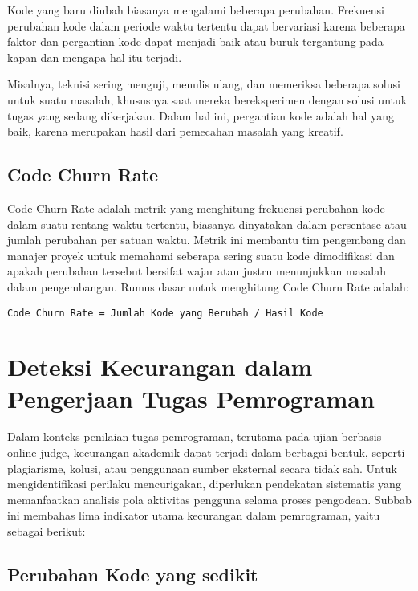 Kode yang baru diubah biasanya mengalami beberapa perubahan. Frekuensi perubahan kode dalam periode waktu tertentu dapat bervariasi karena beberapa faktor dan pergantian kode dapat menjadi baik atau buruk tergantung pada kapan dan mengapa hal itu terjadi.

Misalnya, teknisi sering menguji, menulis ulang, dan memeriksa beberapa solusi untuk suatu masalah, khususnya saat mereka bereksperimen dengan solusi untuk tugas yang sedang dikerjakan. Dalam hal ini, pergantian kode adalah hal yang baik, karena merupakan hasil dari pemecahan masalah yang kreatif.

\subsection{Code Churn Rate}

Code Churn Rate adalah metrik yang menghitung frekuensi perubahan kode dalam suatu rentang waktu tertentu, biasanya dinyatakan dalam persentase atau jumlah perubahan per satuan waktu. Metrik ini membantu tim pengembang dan manajer proyek untuk memahami seberapa sering suatu kode dimodifikasi dan apakah perubahan tersebut bersifat wajar atau justru menunjukkan masalah dalam pengembangan. Rumus dasar untuk menghitung Code Churn Rate adalah:

\begin{center}
	\verb|Code Churn Rate = Jumlah Kode yang Berubah / Hasil Kode|
\end{center}

\section{Deteksi Kecurangan dalam Pengerjaan Tugas Pemrograman}
\label{sec:2:deteksikecurangan}

Dalam konteks penilaian tugas pemrograman, terutama pada ujian berbasis online judge, kecurangan akademik dapat terjadi dalam berbagai bentuk, seperti plagiarisme, kolusi, atau penggunaan sumber eksternal secara tidak sah. Untuk mengidentifikasi perilaku mencurigakan, diperlukan pendekatan sistematis yang memanfaatkan analisis pola aktivitas pengguna selama proses pengodean. Subbab ini membahas lima indikator utama kecurangan dalam pemrograman, yaitu sebagai berikut:

\subsection{Perubahan Kode yang sedikit}

